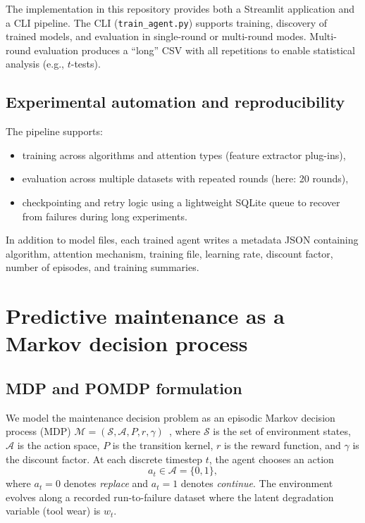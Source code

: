 \documentclass[11pt]{article}
\begin{document}
The implementation in this repository provides both a Streamlit application and a CLI pipeline. The CLI (\texttt{train\_agent.py}) supports training, discovery of trained models, and evaluation in single-round or multi-round modes. Multi-round evaluation produces a ``long'' CSV with all repetitions to enable statistical analysis (e.g., $t$-tests).

\subsection{Experimental automation and reproducibility}
The pipeline supports:
\begin{itemize}
  \item training across algorithms and attention types (feature extractor plug-ins),
  \item evaluation across multiple datasets with repeated rounds (here: 20 rounds),
  \item checkpointing and retry logic using a lightweight SQLite queue to recover from failures during long experiments.
\end{itemize}

In addition to model files, each trained agent writes a metadata JSON containing algorithm, attention mechanism, training file, learning rate, discount factor, number of episodes, and training summaries.

\section{Predictive maintenance as a Markov decision process}
\subsection{MDP and POMDP formulation}
We model the maintenance decision problem as an episodic Markov decision process (MDP) $\mathcal{M}=(\mathcal{S},\mathcal{A},P,r,\gamma)$~\cite{SuttonBarto2018}, where $\mathcal{S}$ is the set of environment states, $\mathcal{A}$ is the action space, $P$ is the transition kernel, $r$ is the reward function, and $\gamma$ is the discount factor. At each discrete timestep $t$, the agent chooses an action
\begin{equation}
  a_t \in \mathcal{A}=\{0,1\},
\end{equation}
where $a_t=0$ denotes \emph{replace} and $a_t=1$ denotes \emph{continue}. The environment evolves along a recorded run-to-failure dataset where the latent degradation variable (tool wear) is $w_t$.
\end{document}
